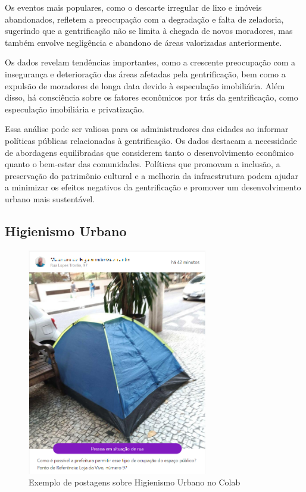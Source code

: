 Os eventos mais populares, como o descarte irregular de lixo e imóveis abandonados, refletem a preocupação com a degradação e falta de zeladoria, sugerindo que a gentrificação não se limita à chegada de novos moradores, mas também envolve negligência e abandono de áreas valorizadas anteriormente.

Os dados revelam tendências importantes, como a crescente preocupação com a insegurança e deterioração das áreas afetadas pela gentrificação, bem como a expulsão de moradores de longa data devido à especulação imobiliária. Além disso, há consciência sobre os fatores econômicos por trás da gentrificação, como especulação imobiliária e privatização.

Essa análise pode ser valiosa para os administradores das cidades ao informar políticas públicas relacionadas à gentrificação. Os dados destacam a necessidade de abordagens equilibradas que considerem tanto o desenvolvimento econômico quanto o bem-estar das comunidades. Políticas que promovam a inclusão, a preservação do patrimônio cultural e a melhoria da infraestrutura podem ajudar a minimizar os efeitos negativos da gentrificação e promover um desenvolvimento urbano mais sustentável.

\subsection{Higienismo Urbano}

\begin{figure}[htb]
	\centering
	\includegraphics[width=0.7\textwidth]{images/colab_posts_higienismo.png}
	\caption{Exemplo de postagens sobre Higienismo Urbano no Colab}
	\label{fig:colab_posts_higienismo}
\end{figure}

